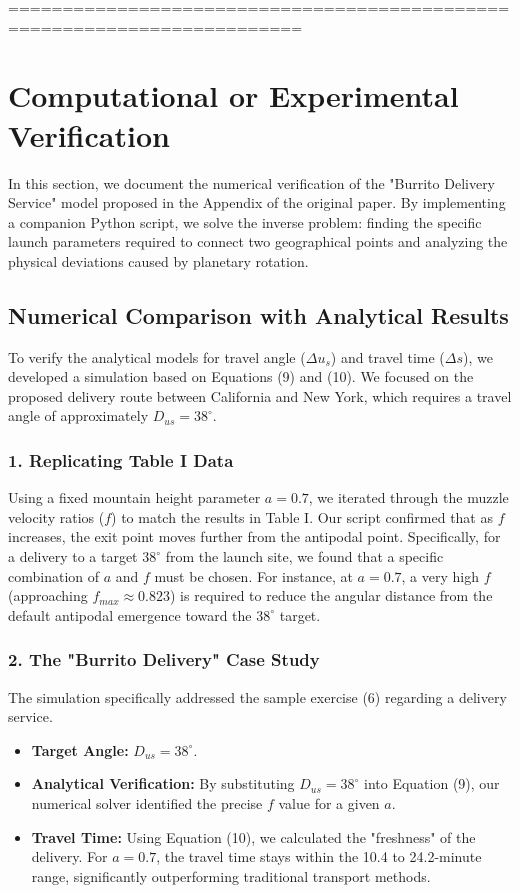\documentclass[11pt,letterpaper]{article}
\begin{document}
=========================================================================
\section{Computational or Experimental Verification}
In this section, we document the numerical verification of the "Burrito Delivery Service" model proposed in the Appendix of the original paper. By implementing a companion Python script, we solve the inverse problem: finding the specific launch parameters required to connect two geographical points and analyzing the physical deviations caused by planetary rotation.

\subsection{Numerical Comparison with Analytical Results}

To verify the analytical models for travel angle ($\Delta u_s$) and travel time ($\Delta s$), we developed a simulation based on Equations (9) and (10). We focused on the proposed delivery route between California and New York, which requires a travel angle of approximately $D_{us} = 38^\circ$.

\subsubsection{1. Replicating Table I Data}
Using a fixed mountain height parameter $a = 0.7$, we iterated through the muzzle velocity ratios ($f$) to match the results in Table I. Our script confirmed that as $f$ increases, the exit point moves further from the antipodal point. Specifically, for a delivery to a target $38^\circ$ from the launch site, we found that a specific combination of $a$ and $f$ must be chosen. For instance, at $a=0.7$, a very high $f$ (approaching $f_{max} \approx 0.823$) is required to reduce the angular distance from the default antipodal emergence toward the $38^\circ$ target.

\subsubsection{2. The "Burrito Delivery" Case Study}
The simulation specifically addressed the sample exercise (6) regarding a delivery service.
\begin{itemize}
    \item \textbf{Target Angle:} $D_{us} = 38^\circ$.
    \item \textbf{Analytical Verification:} By substituting $D_{us} = 38^\circ$ into Equation (9), our numerical solver identified the precise $f$ value for a given $a$. 
    \item \textbf{Travel Time:} Using Equation (10), we calculated the "freshness" of the delivery. For $a=0.7$, the travel time stays within the 10.4 to 24.2-minute range, significantly outperforming traditional transport methods.
\end{itemize}
\end{document}
